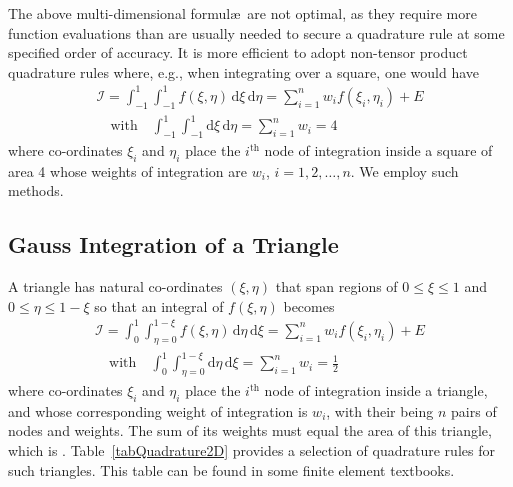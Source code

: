 The above multi-dimensional formul\ae\ are not optimal, as they require more function evaluations than are usually needed to secure a quadrature rule at some specified order of accuracy.  It is more efficient to adopt non-tensor product quadrature rules where, e.g., when integrating over a square, one would have
\begin{multline*}
    \mathcal{I} = \int_{-1}^1 \int_{-1}^1 f ( \xi , \eta ) \, \mathrm{d} \xi \, \mathrm{d} \eta =
    \sum_{i=1}^n w_i f ( \xi_i , \eta_i ) + E  \\ 
    \quad \text{with} \quad
    \int_{-1}^1 \int_{-1}^1 \mathrm{d} \xi \, \mathrm{d} \eta = 
    \sum_{i=1}^n w_i = 4
\end{multline*}
where co-ordinates $\xi_i$ and $\eta_i$ place the $i^{\text{th}}$ node of integration inside a square of area 4 whose weights of integration are $w_i$, $i=1,2,\ldots,n$.  We employ such methods.

\subsection{Gauss Integration of a Triangle}

A triangle has natural co-ordinates $( \xi , \eta )$ that span regions of $0 \leq \xi \leq 1$ and $0 \leq \eta \leq 1 - \xi$ so that an integral of $f(\xi, \eta)$ becomes
\begin{multline}
\mathcal{I} = \int_0^1 \int_{\eta =0}^{1-\xi} f ( \xi , \eta ) \, \mathrm{d} \eta \, \mathrm{d} \xi =
\sum_{i=1}^n w_i f ( \xi_i , \eta_i ) + E \\
\quad \text{with} \quad
\int_0^1 \int_{\eta =0}^{1-\xi} \mathrm{d} \eta \, \mathrm{d} \xi = 
\sum_{i=1}^n w_i = \frac{1}{2}
\label{GaussTriangle}
\end{multline}
where co-ordinates $\xi_i$ and $\eta_i$ place the $i^{\text{th}}$ node of integration inside a triangle, and whose corresponding weight of integration is $w_i$, with their being $n$ pairs of nodes and weights.  The sum of its weights must equal the area of this triangle, which is . Table~\ref{tabQuadrature2D} provides a selection of quadrature rules for such triangles.  This table can be found in some finite element textbooks.


